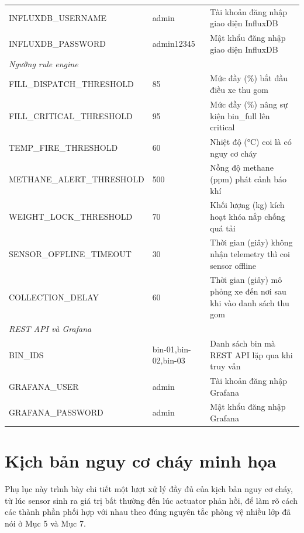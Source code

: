 \documentclass[12pt,a4paper]{article}
\begin{document}
\begin{longtable}{p{4.8cm}p{2.2cm}p{7.5cm}}
INFLUXDB\_\allowbreak USERNAME & admin & Tài khoản đăng nhập giao diện InfluxDB \\
INFLUXDB\_\allowbreak PASSWORD & admin12345 & Mật khẩu đăng nhập giao diện InfluxDB \\
\multicolumn{3}{l}{\textit{Ngưỡng rule engine}} \\
FILL\_\allowbreak DISPATCH\_\allowbreak THRESHOLD & 85 & Mức đầy (\%) bắt đầu điều xe thu gom \\
FILL\_\allowbreak CRITICAL\_\allowbreak THRESHOLD & 95 & Mức đầy (\%) nâng sự kiện bin\_\allowbreak full lên critical \\
TEMP\_\allowbreak FIRE\_\allowbreak THRESHOLD & 60 & Nhiệt độ (°C) coi là có nguy cơ cháy \\
METHANE\_\allowbreak ALERT\_\allowbreak THRESHOLD & 500 & Nồng độ methane (ppm) phát cảnh báo khí \\
WEIGHT\_\allowbreak LOCK\_\allowbreak THRESHOLD & 70 & Khối lượng (kg) kích hoạt khóa nắp chống quá tải \\
SENSOR\_\allowbreak OFFLINE\_\allowbreak TIMEOUT & 30 & Thời gian (giây) không nhận telemetry thì coi sensor offline \\
COLLECTION\_\allowbreak DELAY & 60 & Thời gian (giây) mô phỏng xe đến nơi sau khi vào danh sách thu gom \\
\multicolumn{3}{l}{\textit{REST API và Grafana}} \\
BIN\_\allowbreak IDS & bin-01,bin-02,bin-03 & Danh sách bin mà REST API lặp qua khi truy vấn \\
GRAFANA\_\allowbreak USER & admin & Tài khoản đăng nhập Grafana \\
GRAFANA\_\allowbreak PASSWORD & admin & Mật khẩu đăng nhập Grafana \\
\end{longtable}
\normalsize
\renewcommand{\arraystretch}{1}

\section{Kịch bản nguy cơ cháy minh họa}

Phụ lục này trình bày chi tiết một lượt xử lý đầy đủ của kịch bản nguy cơ cháy, từ lúc sensor sinh ra giá trị bất thường đến lúc actuator phản hồi, để làm rõ cách các thành phần phối hợp với nhau theo đúng nguyên tắc phòng vệ nhiều lớp đã nói ở Mục 5 và Mục 7.
\end{document}
